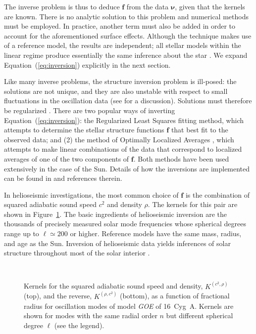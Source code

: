 The inverse problem is thus to deduce $\mathbf f$ from the data $\boldsymbol \nu$, given that the kernels are known. 
There is no analytic solution to this problem and numerical methods must be employed. 
In practice, another term must also be added in order to account for the aforementioned surface effects. 
Although the technique makes use of a reference model, the results are independent; all stellar models within the linear regime produce essentially the same inference about the star \citep{2000ApJ...529.1084B}. 
We expand Equation~(\ref{eq:inversion}) explicitly in the next section. 



Like many inverse problems, the structure inversion problem is ill-posed: the solutions are not unique, and they are also unstable with respect to small fluctuations in the oscillation data (see \citealt{GoughThompson1991} for a discussion). 
Solutions must therefore be regularized \citep[for a review of statistical regularization, see, e.g.,][]{tenorio2001statistical}. 
There are two popular ways of inverting Equation~(\ref{eq:inversion}): the Regularized Least Squares \citep[RLS;][]{tikhonov1977solutions} fitting method, which attempts to determine the stellar structure functions $\mathbf f$ that best fit to the observed data; and (2) the method of Optimally Localized Averages \citep[OLA;][]{1968GeoJ...16..169B}, which attempts to make linear combinations of the data that correspond to localized averages of one of the two components of $\mathbf f$. 
Both methods have been used extensively in the case of the Sun.
Details of how the inversions are implemented can be found in \citealt{2016lrsp...13....2b} and references therein.  


In helioseismic investigations, the most common choice of $\mathbf f$ is the combination of squared adiabatic sound speed $c^2$ and density $\rho$.
The kernels for this pair are shown in Figure~\ref{fig:c2-rho}. 
The basic ingredients of helioseismic inversion are the thousands of precisely measured solar mode frequencies whose spherical degrees range up to ${\ell \simeq 200}$ or higher. 
Reference models have the same mass, radius, and age as the Sun. 
Inversion of helioseismic data yields inferences of solar structure throughout most of the solar interior \citep[see, e.g.,][]{2009ApJ...699.1403B}.  


%
%
%
\begin{figure}
    \centering
    \\
    \caption[$(c^2,\rho)$ kernels for 16~Cyg~A]{Kernels for the squared adiabatic sound speed and density, $K^{(c^2, \rho)}$ (top), and the reverse, $K^{(\rho, c^2)}$ (bottom), as a function of fractional radius for oscillation modes of model \emph{GOE} of 16~Cyg~A. Kernels are shown for modes with the same radial order $n$ but different spherical degree $\ell$ (see the legend). 
    \label{fig:c2-rho} }
\end{figure}
%
%


